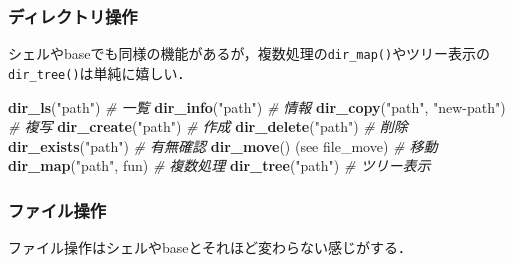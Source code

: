 \documentclass[
]{article}
\newenvironment{Shaded}{\begin{snugshade}}{\end{snugshade}}
\newcommand{\CommentTok}[1]{\textcolor[rgb]{0.56,0.35,0.01}{\textit{#1}}}
\newcommand{\FunctionTok}[1]{\textcolor[rgb]{0.13,0.29,0.53}{\textbf{#1}}}
\newcommand{\NormalTok}[1]{#1}
\newcommand{\StringTok}[1]{\textcolor[rgb]{0.31,0.60,0.02}{#1}}
\begin{document}
\hypertarget{ux30c7ux30a3ux30ecux30afux30c8ux30eaux64cdux4f5c}{%
\subsubsection{ディレクトリ操作}\label{ux30c7ux30a3ux30ecux30afux30c8ux30eaux64cdux4f5c}}

シェルやbaseでも同様の機能があるが，複数処理の\texttt{dir\_map()}やツリー表示の\texttt{dir\_tree()}は単純に嬉しい．

\begin{Shaded}
\begin{Highlighting}[]
\FunctionTok{dir\_ls}\NormalTok{(}\StringTok{"path"}\NormalTok{)               }\CommentTok{\# 一覧   }
\FunctionTok{dir\_info}\NormalTok{(}\StringTok{"path"}\NormalTok{)             }\CommentTok{\# 情報   }
\FunctionTok{dir\_copy}\NormalTok{(}\StringTok{"path"}\NormalTok{, }\StringTok{"new{-}path"}\NormalTok{) }\CommentTok{\# 複写   }
\FunctionTok{dir\_create}\NormalTok{(}\StringTok{"path"}\NormalTok{)           }\CommentTok{\# 作成   }
\FunctionTok{dir\_delete}\NormalTok{(}\StringTok{"path"}\NormalTok{)           }\CommentTok{\# 削除   }
\FunctionTok{dir\_exists}\NormalTok{(}\StringTok{"path"}\NormalTok{)           }\CommentTok{\# 有無確認   }
\FunctionTok{dir\_move}\NormalTok{() (see file\_move)   }\CommentTok{\# 移動   }
\FunctionTok{dir\_map}\NormalTok{(}\StringTok{"path"}\NormalTok{, fun)         }\CommentTok{\# 複数処理   }
\FunctionTok{dir\_tree}\NormalTok{(}\StringTok{"path"}\NormalTok{)             }\CommentTok{\# ツリー表示   }
\end{Highlighting}
\end{Shaded}

\hypertarget{ux30d5ux30a1ux30a4ux30ebux64cdux4f5c}{%
\subsubsection{ファイル操作}\label{ux30d5ux30a1ux30a4ux30ebux64cdux4f5c}}

ファイル操作はシェルやbaseとそれほど変わらない感じがする．
\end{document}
